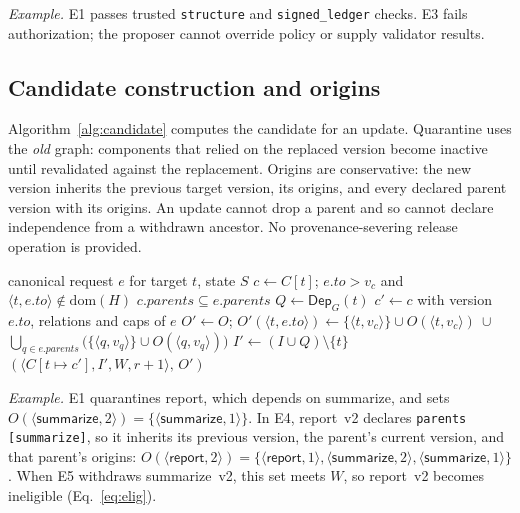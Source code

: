 \documentclass[letterpaper,journal]{IEEEtran}
\newcommand{\sv}[2]{\ensuremath{\langle\textsf{#1},#2\rangle}}
\newcommand{\vid}[2]{\ensuremath{\langle #1,#2\rangle}}
\begin{document}
\textit{Example.} E1 passes trusted \texttt{structure} and \texttt{signed\_ledger} checks. E3 fails authorization; the proposer cannot override policy or supply validator results.

\subsection{Candidate construction and origins}
Algorithm~\ref{alg:candidate} computes the candidate for an update. Quarantine uses the \emph{old} graph: components that relied on the replaced version become inactive until revalidated against the replacement. Origins are conservative: the new version inherits the previous target version, its origins, and every declared parent version with its origins. An update cannot drop a parent and so cannot declare independence from a withdrawn ancestor. No provenance-severing release operation is provided.

\begin{algorithm}[t]\caption{\textsc{Candidate}: update a target $t$}\label{alg:candidate}\footnotesize
\begin{algorithmic}[1]
\Require canonical request $e$ for target $t$, state $S$
\State $c\gets C[t]$; \Req $e.\mathit{to}>v_c$ and $\vid{t}{e.\mathit{to}}\notin\mathrm{dom}(H)$
\State \Req $c.\mathit{parents}\subseteq e.\mathit{parents}$ 
\State $Q\gets\mathsf{Dep}_{G}(t)$ 
\State $c'\gets c$ with version $e.\mathit{to}$, relations and caps of $e$
\State $O'\gets O$; $O'(\vid{t}{e.\mathit{to}})\gets\{\vid{t}{v_c}\}\cup O(\vid{t}{v_c})\ \cup$
\State \hspace{1.5em}$\bigcup_{q\in e.\mathit{parents}}\big(\{\vid{q}{v_q}\}\cup O(\vid{q}{v_q})\big)$
\State $I'\gets (I\cup Q)\setminus\{t\}$ 
\State \Return $(\langle C[t\mapsto c'],I',W,r{+}1\rangle,\,O')$
\end{algorithmic}\end{algorithm}

\textit{Example.} E1 quarantines \textsf{report}, which depends on \textsf{summarize}, and sets $O(\sv{summarize}{2})=\{\sv{summarize}{1}\}$. In E4, \textsf{report}~v2 declares \texttt{parents [summarize]}, so it inherits its previous version, the parent's current version, and that parent's origins:
$O(\sv{report}{2})=\{\sv{report}{1},\sv{summarize}{2},\sv{summarize}{1}\}$.
When E5 withdraws \textsf{summarize}~v2, this set meets $W$, so \textsf{report}~v2 becomes ineligible (Eq.~\eqref{eq:elig}).
\end{document}
